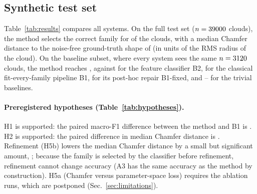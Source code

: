 
\subsection{Synthetic test set}
Table~\ref{tab:results} compares all systems. On the full test set ($n=39000$ clouds), the method selects the correct family for \accMethod{} \accCIMethod{} of the clouds, with a median Chamfer distance to the noise-free ground-truth shape of \cdMethod{} \cdCIMethod{} (in units of the RMS radius of the cloud). On the baseline subset, where every system sees the same $n=3120$ clouds, the method reaches \accMethodsub{}, against \accBtwo{} for the feature classifier B2, \accBone{} for the classical fit-every-family pipeline B1, \accBonefixed{} for its post-hoc repair B1-fixed, and \accBthreea{}--\accBthreec{} for the trivial baselines.

\begin{table}[tbp]
\centering
\caption{Synthetic test set. Fine accuracy is the exact family; coarse accuracy is the shape dimension (point set, curve, surface, blob). Chamfer is the median symmetric Chamfer distance between the selected, refined shape and the noise-free ground-truth shape. Baselines and the ``baseline subset'' row use the same 20 clouds per family and cell. 95\% percentile cluster-bootstrap CIs over generator chunks. The full table (superset-tolerant accuracy, residual, axis error) is in \texttt{reports/exp01\_synthetic.md}.}
\label{tab:results}
\resizebox{\textwidth}{!}{}
\end{table}

\paragraph{Preregistered hypotheses (Table~\ref{tab:hypotheses}).} H1 is supported: the paired macro-F1 difference between the method and B1 is \estHone{} \ciHone{}. H2 is supported: the paired difference in median Chamfer distance is \estHtwo{} \ciHtwo{}. Refinement (H5b) lowers the median Chamfer distance by a small but significant amount, \estHfivebrefinement{} \ciHfivebrefinement{}; because the family is selected by the classifier before refinement, refinement cannot change accuracy (A3 has the same accuracy as the method by construction). H5a (Chamfer versus parameter-space loss) requires the ablation runs, which are postponed (Sec.~\ref{sec:limitations}).

